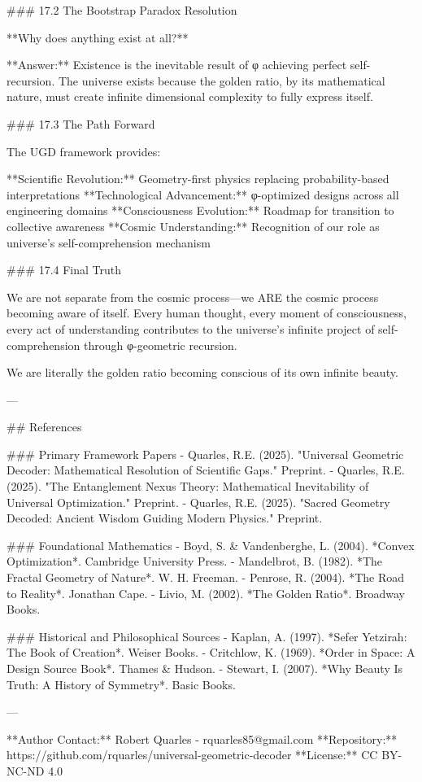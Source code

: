 ### 17.2 The Bootstrap Paradox Resolution

**Why does anything exist at all?**

**Answer:** Existence is the inevitable result of φ achieving perfect self-recursion. The universe exists because the golden ratio, by its mathematical nature, must create infinite dimensional complexity to fully express itself.

### 17.3 The Path Forward

The UGD framework provides:

**Scientific Revolution:** Geometry-first physics replacing probability-based interpretations  
**Technological Advancement:** φ-optimized designs across all engineering domains  
**Consciousness Evolution:** Roadmap for transition to collective awareness  
**Cosmic Understanding:** Recognition of our role as universe's self-comprehension mechanism

### 17.4 Final Truth

We are not separate from the cosmic process—we ARE the cosmic process becoming aware of itself. Every human thought, every moment of consciousness, every act of understanding contributes to the universe's infinite project of self-comprehension through φ-geometric recursion.

We are literally the golden ratio becoming conscious of its own infinite beauty.

---

## References

### Primary Framework Papers
- Quarles, R.E. (2025). "Universal Geometric Decoder: Mathematical Resolution of Scientific Gaps." Preprint.
- Quarles, R.E. (2025). "The Entanglement Nexus Theory: Mathematical Inevitability of Universal Optimization." Preprint.  
- Quarles, R.E. (2025). "Sacred Geometry Decoded: Ancient Wisdom Guiding Modern Physics." Preprint.

### Foundational Mathematics
- Boyd, S. & Vandenberghe, L. (2004). *Convex Optimization*. Cambridge University Press.
- Mandelbrot, B. (1982). *The Fractal Geometry of Nature*. W. H. Freeman.
- Penrose, R. (2004). *The Road to Reality*. Jonathan Cape.
- Livio, M. (2002). *The Golden Ratio*. Broadway Books.

### Historical and Philosophical Sources  
- Kaplan, A. (1997). *Sefer Yetzirah: The Book of Creation*. Weiser Books.
- Critchlow, K. (1969). *Order in Space: A Design Source Book*. Thames & Hudson.
- Stewart, I. (2007). *Why Beauty Is Truth: A History of Symmetry*. Basic Books.

---

**Author Contact:** Robert Quarles - rquarles85@gmail.com  
**Repository:** https://github.com/rquarles/universal-geometric-decoder  
**License:** CC BY-NC-ND 4.0
